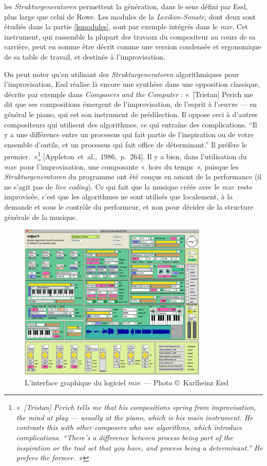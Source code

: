 \documentclass[a4paper,12pt]{article}
\newcommand{\guill}[1]{«~#1~»}
\newcommand{\guilldeux}[1]{“#1”}
\newcommand{\maze}[0]{\emph{m\symbol{64}ze\textdegree2}}
\newcommand{\cicite}[1]{{\footnotesize[#1]}}
\begin{document}
les \emph{Strukturgeneratoren} permettent la génération, dans le sens défini par Essl, plus large que celui de Rowe. Les modules de la \emph{Lexikon-Sonate}, dont deux sont étudiés dans la partie \ref{lsmodules}, sont par exemple intégrés dans le \maze. Cet instrument, qui rassemble la plupart des travaux du compositeur au cours de sa carrière, peut en somme être décrit comme une version condensée et ergonomique de sa table de travail, et destinée à l'improvisation.

On peut noter qu'en utilisant des \emph{Strukturgeneratoren} algorithmiques pour l'improvisation, Essl réalise là encore une synthèse dans une opposition classique, décrite par exemple dans \emph{Composers and the Computer} : \guill{[Tristan] Perich me dit que ses compositions émergent de l'improvisation, de l'esprit à l'œuvre --- en général le piano, qui est son instrument de prédilection. Il oppose ceci à d'autres compositeurs qui utilisent des algorithmes, ce qui entraîne des complications. \guilldeux{Il y a une différence entre un processus qui fait partie de l'inspiration ou de votre ensemble d'outils, et un processus qui fait office de déterminant.} Il préfère le premier.}\footnote{\guill{\emph{[Tristan] Perich tells me that his compositions spring from improvisation, the mind at play --- usually at the piano, which is his main instrument. He contrasts this with other composers who use algorithms, which introduce complications. \guilldeux{There's a difference between process being part of the inspiration or the tool set that you have, and process being a determinant.} He prefers the former.}}} \cicite{Appleton~et~al.,~1986,~p.~264}. Il y a bien, dans l'utilisation du \maze~pour l'improvisation, une composante \guill{hors du temps}, puisque les \emph{Strukturgeneratoren} du programme ont été conçus en amont de la performance (il ne s'agit pas de \emph{live coding}). Ce qui fait que la musique créée avec le \maze~reste improvisée, c'est que les algorithmes ne sont utilisés que localement, à la demande et sous le contrôle du performeur, et non pour décider de la structure générale de la musique.

\begin{figure}[!h]
\begin{center}
\includegraphics[width=9cm]{images/maze.png}
\caption{\footnotesize L'interface graphique du logiciel \maze~--- Photo \copyright~Karlheinz Essl}
\label{mazephoto}
\end{center}
\end{figure}
\end{document}

